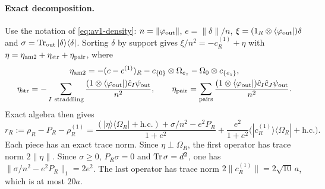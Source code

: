 \paragraph{Exact decomposition.}
Use the notation of \eqref{eq:av1-density}: $n=\lVert \varphi_{\rm out}\rVert$,
$e=\lVert \delta\rVert /n$, $\xi=(1_R\otimes\langle\varphi_{\rm out}|)\delta$ and
$\sigma=\operatorname{Tr}_{\rm out}|\delta\rangle\langle\delta|$. Sorting $\delta$ by support
gives $\xi/n^2=-c^{(1)}_R+\eta$ with
$\eta=\eta_{\rm am2}+\eta_{\rm str}+\eta_{\rm pair}$, where
\begin{equation}
 \begin{gathered}
 \eta_{\rm am2}=-(c-c^{(1)})_R-c_{\{0\}}\otimes\Omega_{e_z}-\Omega_0\otimes c_{\{e_z\}},\\
 \eta_{\rm str}=-\sum_{I\ \rm straddling}
 \frac{(1\otimes\langle\varphi_{\rm out}|)\hat c_I\psi_{\rm out}}{n^2},\qquad
 \eta_{\rm pair}=\sum_{\rm pairs}
 \frac{(1\otimes\langle\varphi_{\rm out}|)\hat c_I\hat c_J\psi_{\rm out}}{n^2}.
 \end{gathered}
 \label{eq:ay1-eta}
\end{equation}
Exact algebra then gives
\begin{equation}
 r_R:=\rho_R-P_R-\rho^{(1)}_R
 =\frac{(|\eta\rangle\langle\Omega_R|+\text{h.c.})+\sigma/n^2-e^2P_R}{1+e^2}
 +\frac{e^2}{1+e^2}\bigl(|c^{(1)}_R\rangle\langle\Omega_R|+\text{h.c.}\bigr).
 \label{eq:ay1-remainder}
\end{equation}
Each piece has an exact trace norm. Since $\eta\perp\Omega_R$, the first
operator has trace norm $2\lVert \eta\rVert$. Since $\sigma\ge0$, $P_R\sigma=0$ and
$\operatorname{Tr}\sigma=d^2$, one has $\lVert \sigma/n^2-e^2P_R\rVert_1=2e^2$. The last operator
has trace norm $2\lVert c^{(1)}_R\rVert =2\sqrt{10}\,a$, which is at most $20a$.

